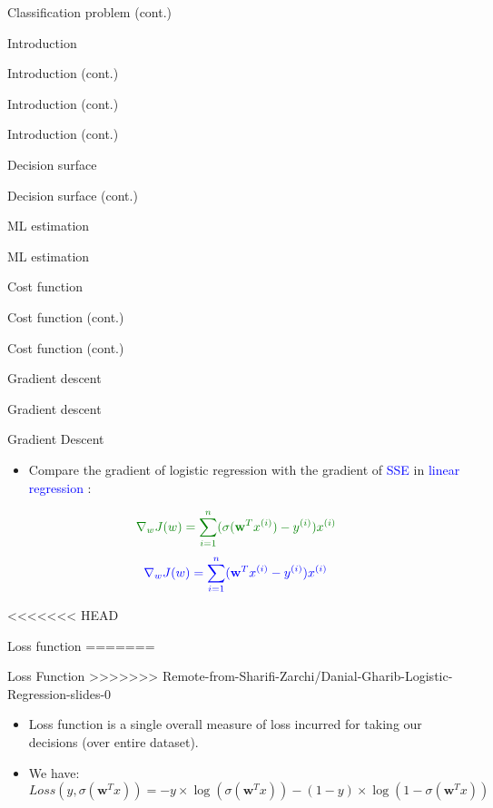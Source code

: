 \documentclass[serif, aspectratio=169]{beamer}
\begin{document}
\begin{frame}{Classification problem (cont.)}
\begin{itemize}
\begin{frame}{Introduction}
\begin{itemize}
\begin{frame}{Introduction (cont.)}
\begin{frame}{Introduction (cont.)}
\begin{frame}{Introduction (cont.)}
\begin{frame}{Decision surface}
\begin{itemize}
\begin{frame}{Decision surface (cont.)}
\begin{frame}{ML estimation}
\begin{frame}{ML estimation}
\begin{itemize}
\begin{frame}{Cost function}
\begin{frame}{Cost function (cont.)}
\begin{itemize}
\begin{itemize}
\begin{frame}{Cost function (cont.)}
\begin{frame}{Gradient descent}
\begin{frame}{Gradient descent}
\begin{frame}{Gradient Descent}
\begin{itemize}
    \item Compare the gradient of \textcolor{deepgreen}{logistic regression} with the gradient of \textcolor{blue}{SSE} in \textcolor{blue}{linear regression} :
    \end{itemize}
        \begin{align*}
        \color{deepgreen}
             \nabla _w J(w) = \sum_{i=1}^{n} (\sigma (\mathbf{w}^Tx^{(i)}) - y^{(i)})x^{(i)} 
        \end{align*}
        \begin{align*}
            \color{blue}
            \nabla _w J(w) = \sum_{i=1}^{n} (\mathbf{w}^Tx^{(i)} - y^{(i)})x^{(i)}
        \end{align*}
        
\end{frame}


<<<<<<< HEAD
\begin{frame}{Loss function}
=======
\begin{frame}{Loss Function}
>>>>>>> Remote-from-Sharifi-Zarchi/Danial-Gharib-Logistic-Regression-slides-0
    \begin{itemize}
        \item Loss function is a single overall measure of loss incurred for taking our decisions (over entire dataset).
        \item We have:
        \[ Loss(y, \sigma (\mathbf{w}^T x)) = -y \times \log (\sigma ( \mathbf{w}^T x)) - (1-y) \times \log 
        (1 - \sigma (\mathbf{w}^T x))
        \]
        

\end{itemize}
\end{frame}
\end{frame}
\end{frame}
\end{frame}
\end{frame}
\end{itemize}
\end{itemize}
\end{frame}
\end{frame}
\end{itemize}
\end{frame}
\end{frame}
\end{frame}
\end{itemize}
\end{frame}
\end{frame}
\end{frame}
\end{frame}
\end{itemize}
\end{frame}
\end{itemize}
\end{frame}
\end{document}
